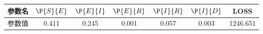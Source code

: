 \begin{tabular}{ccccccc}
\hline
参数名&$\P{S}{E}$&$\P{E}{I}$&$\P{E}{R}$&$\P{I}{R}$&$\P{I}{D}$&LOSS\\
\hline
参数值&0.411&0.245&0.001&0.057&0.003&1246.651\\
\hline
\end{tabular}